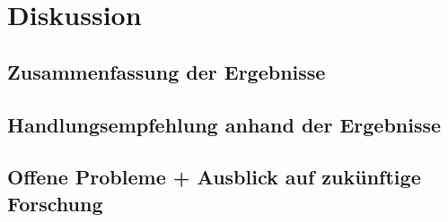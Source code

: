 \chapter{Diskussion}
\section{Zusammenfassung der Ergebnisse}
\section{Handlungsempfehlung anhand der Ergebnisse}
\section{Offene Probleme + Ausblick auf zukünftige Forschung}